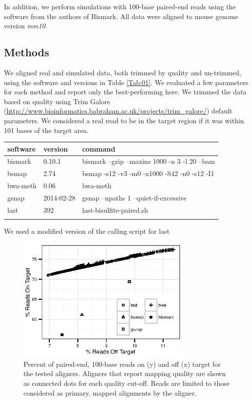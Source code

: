 \documentclass{bioinfo}
\begin{document}
In addition, we perform simulations with 100-base paired-end reads using
the software from the authors of Bismark. All data were aligned to mouse
genome version \textit{mm10}.


\begin{methods}
\section{Methods}
We aligned real and simulated data, both trimmed by quality and
un-trimmed, using the software and versions in Table \ref{Tab:01}.
We evaluated a few parameters for each method and report only the
best-performing here. We trimmed the data based on quality
using Trim Galore (\href{http://www.bioinformatics.babraham.ac.uk/projects/trim\_galore/}{http://www.bioinformatics.babraham.ac.uk/projects/trim\_galore/})
default parameters.
We considered a real read to be in the target region if it
was within 101 bases of the target area. 

\begin{table}[!t]
{\begin{tabular}{lll}\toprule
software & version & command\\\midrule
bismark & 0.10.1 & bismark --gzip --maxins 1000 -n 3 -l 20 --bam\\
bsmap & 2.74 & bsmap -s12 -v3 -m0 -x1000 -S42 -n0 -s12 -I1\\
bwa-meth & 0.06 & bwa-meth\\
gsnap & 2014-02-28 & gsnap --npaths 1 --quiet-if-excessive\\
last & 392 & last-bisulfite-paired.sh\\\botrule
\end{tabular}}{We used a modified version of the calling script for last}
\end{table}

\end{methods}

\begin{figure}[!tpb]%
    \centerline{\includegraphics[width=86mm]{qual-plot-real}}
    \caption{Percent of paired-end, 100-base reads on (y) and off (x) target for the tested aligners. Aligners that report mapping quality are shown as connected dots for each quality cut-off. Reads are limited to those considered as primary, mapped alignments by the aligner.}\label{fig:01}
\end{figure}
\end{document}
